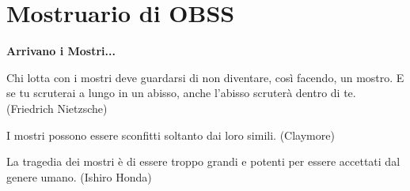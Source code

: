\section{Mostruario di OBSS}

\textbf{Arrivano i Mostri...}

\begin{changemargin}{0cm}{0.5cm}\begin{enfasi}{Chi lotta con i mostri deve guardarsi di non diventare, così facendo, un mostro. E se tu scruterai a lungo in un abisso, anche l'abisso scruterà dentro di te. (Friedrich Nietzsche)

\medskip

I mostri possono essere sconfitti soltanto dai loro simili. (Claymore)

\medskip

La tragedia dei mostri è di essere troppo grandi e potenti per essere accettati dal genere umano. (Ishiro Honda)}\end{enfasi}\end{changemargin}\medskip

